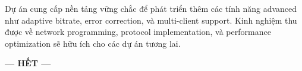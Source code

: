 Dự án cung cấp nền tảng vững chắc để phát triển thêm các tính năng advanced như adaptive bitrate, error correction, và multi-client support. Kinh nghiệm thu được về network programming, protocol implementation, và performance optimization sẽ hữu ích cho các dự án tương lai.

\vspace{1cm}

\begin{center}
\textbf{--- HẾT ---}
\end{center}


